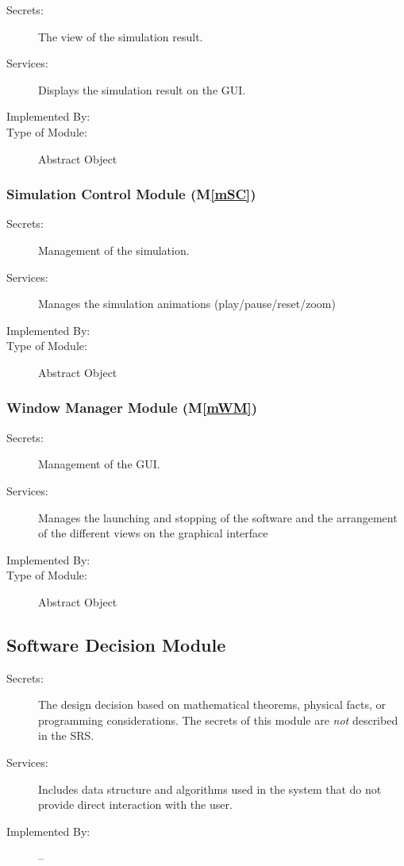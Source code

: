 \documentclass[12pt, titlepage]{article}
\newcommand{\mref}[1]{M\ref{#1}}
\begin{document}
\begin{description}
\item[Secrets:]The view of the simulation result.
\item[Services:]Displays the simulation result on the GUI.
\item[Implemented By:] \progname
\item[Type of Module:] Abstract Object
\end{description}

\subsubsection{Simulation Control Module (\mref{mSC})}

\begin{description}
\item[Secrets:]Management of the simulation.
\item[Services:]Manages the simulation animations (play/pause/reset/zoom)
\item[Implemented By:] \progname
\item[Type of Module:] Abstract Object
\end{description}

\subsubsection{Window Manager Module (\mref{mWM})}

\begin{description}
\item[Secrets:]Management of the GUI.
\item[Services:]Manages the launching and stopping of the software and the arrangement of the different views on the graphical interface
\item[Implemented By:] \progname
\item[Type of Module:] Abstract Object
\end{description}


\subsection{Software Decision Module}

\begin{description}
\item[Secrets:] The design decision based on mathematical theorems, physical
  facts, or programming considerations. The secrets of this module are
  \emph{not} described in the SRS.
\item[Services:] Includes data structure and algorithms used in the system that
  do not provide direct interaction with the user.
\item[Implemented By:] --
\end{description}
\end{document}
